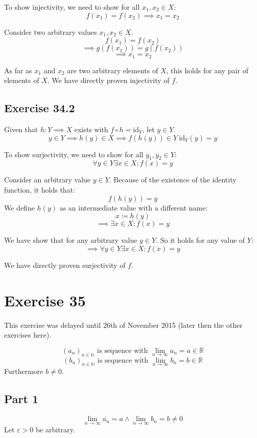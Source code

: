 \documentclass[a4paper]{article}
\theoremstyle{definition}
\begin{document}
To show injectivity, we need to show for all $x_1, x_2 \in X$:
\[ f(x_1) = f(x_2) \implies x_1 = x_2 \]

Consider two arbitrary values $x_1, x_2 \in X$.
\[ f(x_1) = f(x_2) \]
\[ \implies g(f(x_1)) = g(f(x_2)) \]
\[ \implies x_1 = x_2 \]

As far as $x_1$ and $x_2$ are two arbitrary elements of $X$, this holds for any pair of elements of $X$.
We have directly proven injectivity of $f$.

\subsection{Exercise 34.2}
%
Given that $h: Y \implies X$ exists with $f \circ h = \text{id}_Y$,
let $y \in Y$.
\[ y \in Y \implies h(y) \in X \implies f(h(y)) \in Y \ \text{id}_Y(y) = y \]

To show surjectivity, we need to show for all $y_1, y_2 \in Y$:
\[ \forall y \in Y \exists x \in X: f(x) = y \]

Consider an arbitrary value $y \in Y$. Because of the existence of the identity function, it holds that:
\[ f(h(y)) = y \]
We define $h(y)$ as an intermediate value with a different name:
\[ x \coloneqq h(y) \]
\[ \implies \exists x \in X: f(x) = y \]

We have show that for any arbitrary value $y \in Y$. So it holds for any value of $Y$:
\[ \implies \forall y \in Y \exists x \in X: f(x) = y \]

We have directly proven surjectivity of $f$.


\section{Exercise 35}

This exercise was delayed until 26th of November 2015 (later then the other exercises here).

\[ (a_n)_{n \in \mathbb N} \text{ is sequence with } \lim_{n \to \infty} a_n = a \in \mathbb R \]
\[ (b_n)_{n \in \mathbb N} \text{ is sequence with } \lim_{n \to \infty} b_n = b \in \mathbb R \]
Furthermore $b \neq 0$.

\subsection{Part 1}

\[ \lim_{n\to\infty} a_n = a \land \lim_{n\to\infty} b_n = b \neq 0 \]
Let $\varepsilon > 0$ be arbitrary.
\end{document}
